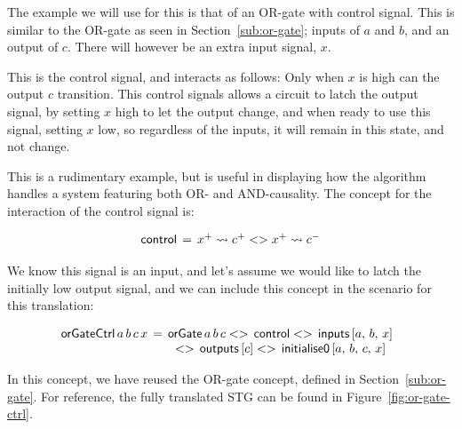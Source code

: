 \documentclass[british,conference,compsoc]{IEEEtran}
\begin{document}
The example we will use for this is that of an OR-gate with control signal. 
This is similar to the OR-gate as seen in Section~\ref{sub:or-gate}; inputs
of $a$ and $b$, and an output of $c$. There will however be an extra 
input signal, $x$. 

This is the control signal, and interacts as follows:
Only when $x$ is high can the output $c$ transition. This control signals
allows a circuit to latch the output signal, by setting $x$ high to let
the output change, and when ready to use this signal, setting $x$ low,
so regardless of the inputs, it will remain in this state, and not change.

This is a rudimentary example, but is useful in displaying how the algorithm
handles a system featuring both OR- and AND-causality. The concept for 
the interaction of the control signal is:

\[
\begin{array}{lcl}
\mathsf{control}&\hspace{-2mm}=&\hspace{-2mm}x^{+} \rightsquigarrow c^{+} <> x^{+} \rightsquigarrow c^{-} 
\end{array}
\]

We know this signal is an input, and let's assume we would like to latch
the initially low output signal, and we can include this concept in the 
scenario for this translation:

\[
\begin{array}{lcl}
\hspace{-2mm}\mathsf{orGateCtrl}\,  a \, b \, c \, x &\hspace{-2mm}=&\hspace{-2mm}\mathsf{orGate}\, a\, b\, c <>\, \mathsf{control}
<>\, \mathsf{inputs}\, [a,\, b,\, x] \\
&& <> \, \mathsf{outputs} \,  [c] <>\, \mathsf{initialise0}\, [a,\, b,\, c,\, x]
\end{array}
\]

In this concept, we have reused the OR-gate concept, defined in Section~\ref{sub:or-gate}. 
For reference, the fully translated STG can be found in Figure~\ref{fig:or-gate-ctrl}.

\end{document}
